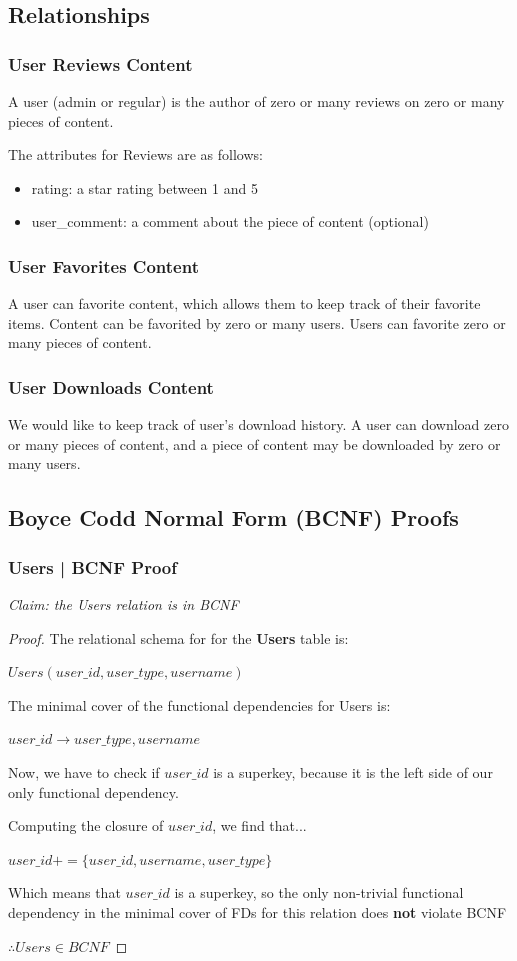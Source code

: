 \documentclass[letter, 12pt, titlepage]{article}
\begin{document}
\subsection{Relationships}
\subsubsection{User Reviews Content}
A user (admin or regular) is the author of zero or many reviews on zero or many pieces of content.

The attributes for Reviews are as follows:
\begin{itemize}
	\item rating: a star rating between 1 and 5
	\item user\_comment: a comment about the piece of content (optional)
\end{itemize}
\subsubsection{User Favorites Content}
A user can favorite content, which allows them to keep track of their favorite items. Content can be favorited by zero or many users. Users can favorite zero or many pieces of content.
\subsubsection{User Downloads Content}
We would like to keep track of user's download history. A user can download zero or many pieces of content, and a piece of content may be downloaded by zero or many users.

\subsection{Boyce Codd Normal Form (BCNF) Proofs}
\subsubsection{Users | BCNF Proof }


\textit{Claim: the Users relation is in BCNF}


\begin{proof}


	The relational schema for for the \textbf{Users} table is:


	$ Users(user\_id, user\_type, username) $


	The minimal cover of the functional dependencies for Users is:


	$ user\_id \rightarrow user\_type, username $


	Now, we have to check if $user\_id$ is a superkey, because it is the left side of our only functional dependency.


	Computing the closure of $user\_id$, we find that...

	$user\_id+ = \{user\_id, username, user\_type\}$

	Which means that $user\_id$ is a superkey, so the only non-trivial functional dependency in the minimal cover of FDs for this relation does \textbf{not} violate BCNF

	$\therefore Users \in BCNF $
\end{proof}
\end{document}
